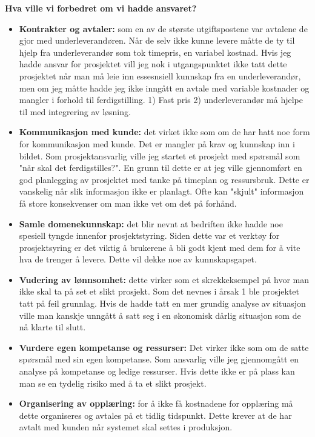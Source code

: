 		\clearpage
		{\bf Hva ville vi forbedret om vi hadde ansvaret?}
		\begin{itemize}
			\item {\bf Kontrakter og avtaler:} som en av de største utgiftspostene var avtalene de gjor
			med underleverandøren. Når de selv ikke kunne levere måtte de ty til hjelp fra underleverandør
			som tok timepris, en variabel kostnad. Hvis jeg hadde ansvar for prosjektet vill jeg
			nok i utgangspunktet ikke tatt dette prosjektet når man må leie inn essesnsiell kunnskap fra
			en underleverandør, men om jeg måtte hadde jeg ikke inngått en avtale med variable kostnader og
			mangler i forhold til ferdigstilling. 1) Fast pris 2) underleverandør må hjelpe til med integrering
			av løsning.
			\item {\bf Kommunikasjon med kunde:} det virket ikke som om de har hatt noe form for kommunikasjon
			med kunde. Det er mangler på krav og kunnskap inn i bildet. Som prosjektansvarlig ville jeg
			startet et prosjekt med spørsmål som "når skal det ferdigstilles?". En grunn til dette er at jeg 
			ville gjennomført en god planlegging av prosjektet med tanke på timeplan og ressursbruk. Dette er vanskelig
			når slik informasjon ikke er planlagt. Ofte kan "skjult" informasjon få store konsekvenser om man
			ikke vet om det på forhånd. 
			\item {\bf Samle domenekunnskap:} det blir nevnt at bedriften ikke hadde noe spesiell tyngde innenfor
			prosjektstyring. Siden dette var et verktøy for prosjektsyring er det viktig å brukerene å bli godt kjent
			med dem for å vite hva de trenger å levere. Dette vil dekke noe av kunnskapsgapet. 
			\item {\bf Vudering av lønnsomhet:} dette virker som et skrekkeksempel på hvor man ikke skal ta 
			på set et slikt prosjekt. Som det nevnes i årsak 1 ble prosjektet tatt på feil grunnlag. Hvis de
			hadde tatt en mer grundig analyse av situasjon ville man kanskje unngått å satt seg i en økonomisk 
			dårlig situasjon som de nå klarte til slutt. 
			\item{\bf Vurdere egen kompetanse og ressurser:} Det virker ikke som om de satte spørsmål med sin egen
			kompetanse. Som ansvarlig ville jeg gjennomgått en analyse på kompetanse og ledige ressurser. 
			Hvis dette ikke er på plass kan man se en tydelig risiko med å ta et slikt prosjekt. 
			\item{\bf Organisering av opplæring:} for å ikke få kostnadene for opplæring må dette organiseres og 
			avtales på et tidlig tidspunkt. Dette krever at de har avtalt med kunden når systemet
			skal settes i produksjon. 
		\end{itemize}

